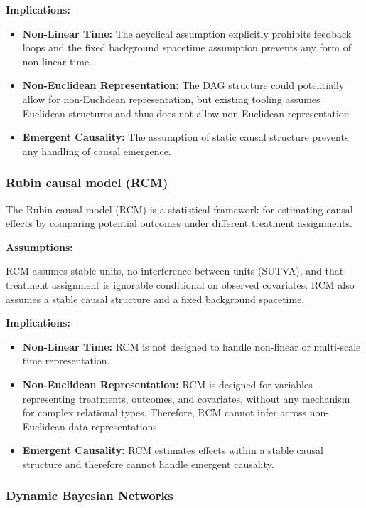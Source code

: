\textbf{Implications:}

\begin{itemize}
    \item \textbf{Non-Linear Time:} The acyclical assumption explicitly prohibits feedback loops and the fixed background spacetime assumption prevents any form of non-linear time.
    \item \textbf{Non-Euclidean Representation:} The DAG structure could potentially allow for non-Euclidean representation, but existing tooling assumes Euclidean structures and thus does not allow non-Euclidean representation
    \item \textbf{Emergent Causality:} The assumption of static causal structure prevents any handling of causal emergence.
\end{itemize}


\subsubsection*{Rubin causal model (RCM)}

The Rubin causal model\cite{rubin2005causal} (RCM) is a statistical framework for estimating causal effects by comparing potential outcomes under different treatment assignments.

\textbf{Assumptions:}

RCM assumes stable units, no interference between units (SUTVA), and that treatment assignment is ignorable conditional on observed covariates. RCM also assumes a stable causal structure and a fixed background spacetime.

\textbf{Implications:}

\begin{itemize}
    \item \textbf{Non-Linear Time:} RCM is not designed to handle non-linear or multi-scale time representation.
    \item \textbf{Non-Euclidean Representation:} RCM is designed for variables representing treatments, outcomes, and covariates, without any mechanism for complex relational types. Therefore, RCM cannot infer across non-Euclidean data representations.
    \item \textbf{Emergent Causality:} RCM estimates effects within a stable causal structure and therefore cannot handle emergent causality.
\end{itemize}

\subsubsection*{Dynamic Bayesian Networks}

